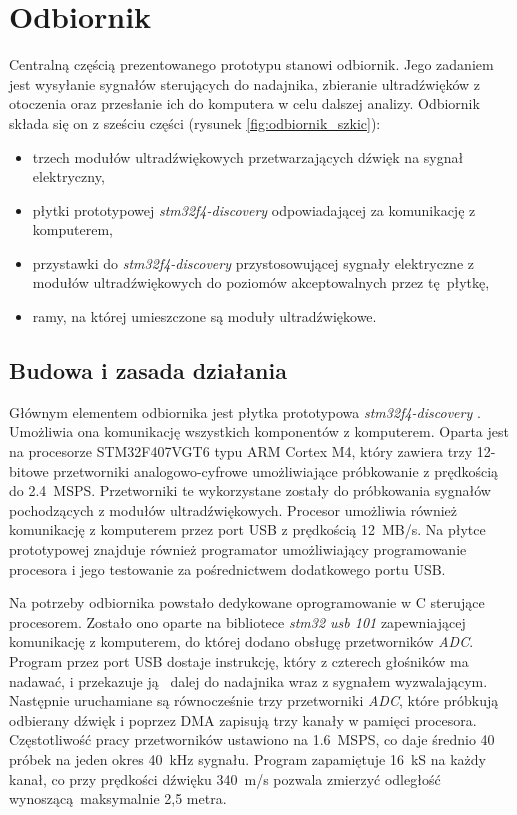 \chapter{Odbiornik}

Centralną częścią prezentowanego prototypu stanowi odbiornik.
Jego zadaniem jest wysyłanie sygnałów sterujących do nadajnika, zbieranie ultradźwięków z otoczenia oraz przesłanie 
ich do komputera w celu dalszej analizy.
Odbiornik składa się on z sześciu części (rysunek \ref{fig:odbiornik_szkic}):

\begin{itemize}
 \item trzech modułów ultradźwiękowych przetwarzających dźwięk na sygnał elektryczny,
 \item płytki prototypowej \textit{stm32f4-discovery} \cite{bib:stm32f4Discovery} odpowiadającej za komunikację z komputerem,
 \item przystawki do \textit{stm32f4-discovery} przystosowującej sygnały elektryczne z modułów ultradźwiękowych
  do poziomów akceptowalnych przez tę płytkę,
 \item ramy, na której umieszczone są moduły ultradźwiękowe.
\end{itemize}




\section{Budowa i zasada działania}

Głównym elementem odbiornika jest płytka prototypowa \textit{stm32f4-discovery} \cite{bib:stm32f4Discovery}.
 Umożliwia ona komunikację wszystkich komponentów z komputerem.
Oparta jest na procesorze STM32F407VGT6 \cite{bib:stm32f407} typu ARM Cortex M4, 
który zawiera trzy 12-bitowe przetworniki
analogowo-cyfrowe umożliwiające próbkowanie z prędkością do \SI{2,4}{MSPS}. Przetworniki te wykorzystane zostały do próbkowania
sygnałów pochodzących z modułów ultradźwiękowych. Procesor umożliwia również komunikację z komputerem przez 
port USB z prędkością \SI{12}{MB/s}. Na płytce prototypowej znajduje również programator
umożliwiający programowanie procesora i jego testowanie za pośrednictwem dodatkowego portu USB.

Na potrzeby odbiornika powstało dedykowane oprogramowanie w C sterujące procesorem.
Zostało ono oparte na bibliotece \textit{stm32 usb 101} \cite{bib:stm32_usb_101}
zapewniającej komunikację z komputerem, do której dodano obsługę przetworników \textit{ADC}.
Program przez port USB dostaje instrukcję, który z czterech głośników ma nadawać, i przekazuje ją 
dalej do nadajnika wraz z sygnałem wyzwalającym. Następnie uruchamiane są równocześnie trzy przetworniki \textit{ADC}, które 
próbkują odbierany dźwięk i poprzez DMA zapisują trzy kanały w pamięci procesora.
Częstotliwość pracy przetworników ustawiono na \SI{1,6}{MSPS}, co daje średnio 40 próbek na jeden okres \SI{40}{kHz} sygnału.
Program zapamiętuje \SI{16}{kS} na każdy kanał, co przy prędkości dźwięku \SI{340}{m/s} pozwala zmierzyć odległość 
wynoszącą maksymalnie 2,5 metra.


